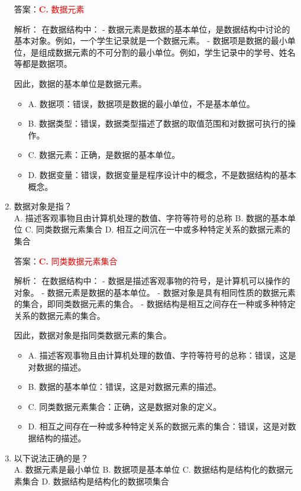 \documentclass[lang=cn,newtx,10pt,scheme=chinese]{../../../elegantbook}
\begin{document}
\begin{enumerate}
    答案：\textcolor{red}{\textbf{C.} 数据元素}

    解析：
    在数据结构中：
    - 数据元素是数据的基本单位，是数据结构中讨论的基本对象。例如，一个学生记录就是一个数据元素。
    - 数据项是数据的最小单位，是组成数据元素的不可分割的最小单位。例如，学生记录中的学号、姓名等都是数据项。
    
    因此，数据的基本单位是数据元素。

    \begin{itemize}
        \item A. 数据项：错误，数据项是数据的最小单位，不是基本单位。
        \item B. 数据类型：错误，数据类型描述了数据的取值范围和对数据可执行的操作。
        \item C. 数据元素：正确，是数据的基本单位。
        \item D. 数据变量：错误，数据变量是程序设计中的概念，不是数据结构的基本概念。
    \end{itemize}

    \item 数据对象是指？\\
    A. 描述客观事物且由计算机处理的数值、字符等符号的总称 \quad 
    B. 数据的基本单位
    C. 同类数据元素集合
    D. 相互之间沉在一中或多种特定关系的数据元素的集合

    答案：\textcolor{red}{\textbf{C.} 同类数据元素集合}

    解析：
    在数据结构中：
    - 数据是描述客观事物的符号，是计算机可以操作的对象。
    - 数据元素是数据的基本单位。
    - 数据对象是具有相同性质的数据元素的集合，即同类数据元素的集合。
    - 数据结构是相互之间存在一种或多种特定关系的数据元素的集合。
    
    因此，数据对象是指同类数据元素的集合。

    \begin{itemize}
        \item A. 描述客观事物且由计算机处理的数值、字符等符号的总称：错误，这是对数据的描述。
        \item B. 数据的基本单位：错误，这是对数据元素的描述。
        \item C. 同类数据元素集合：正确，这是数据对象的定义。
        \item D. 相互之间存在一种或多种特定关系的数据元素的集合：错误，这是对数据结构的描述。
    \end{itemize}

    \item 以下说法正确的是？\\
    A. 数据元素是最小单位 \quad B. 数据项是基本单位
    \quad C. 数据结构是结构化的数据元素集合 \quad D. 数据结构是结构化的数据项集合


\end{enumerate}
\end{document}
